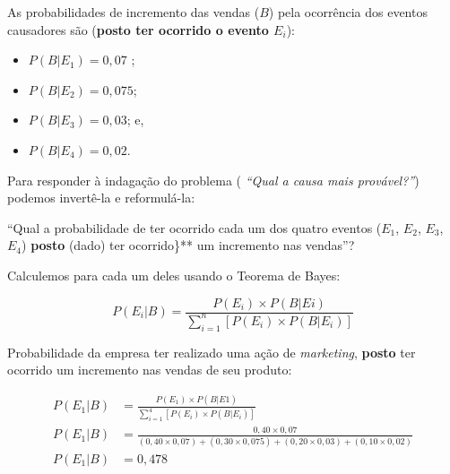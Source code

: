 \documentclass[
]{book}
\providecommand{\tightlist}{%
  \setlength{\itemsep}{0pt}\setlength{\parskip}{0pt}}
\begin{document}
\hfill\break

As probabilidades de incremento das vendas (\(B\)) pela ocorrência dos eventos causadores são (\textbf{posto ter ocorrido o evento \(E_{i}\)}):

\hfill\break

\begin{itemize}
\tightlist
\item
  \(P(B|E_{1}) = 0,07\) ;
\item
  \(P(B|E_{2}) = 0,075\);\\
\item
  \(P(B|E_{3}) = 0,03\); e,\\
\item
  \(P(B|E_{4}) = 0,02\).
\end{itemize}

\hfill\break

Para responder à indagação do problema ( \emph{``Qual a causa mais provável?''}) podemos invertê-la e reformulá-la:

\hfill\break

``Qual a probabilidade de ter ocorrido cada um dos quatro eventos (\(E_{1}\), \(E_{2}\), \(E_{3}\), \(E_{4}\)) \textbf{posto} (dado) ter ocorrido\}** um incremento nas vendas''?

\hfill\break

Calculemos para cada um deles usando o Teorema de Bayes:

\hfill\break

\[
P(E_{i}|B) = \frac{ P(E_{i}) \times P(B|E{i})   }{  \sum _{i=1}^{n}\left[P\left({E}_{i}\right)\times P\left(B|{E}_{i}\right)\right]  }
\]

\hfill\break

Probabilidade da empresa ter realizado uma ação de \emph{marketing}, \textbf{posto} ter ocorrido um incremento nas vendas de seu produto:

\hfill\break

\begin{align*}
P(E_{1}|B) &  = \frac{ P(E_{1}) \times P(B|E{1})   }{  \sum _{i=1}^{4}\left[P\left({E}_{i}\right)\times P\left(B|{E}_{i}\right)\right] } \\
P(E_{1}|B) & = \frac{0,40 \times 0,07} { (0,40 \times 0,07) + (0,30 \times 0,075) +(0,20 \times 0,03) +(0,10 \times 0,02) } \\
P(E_{1}|B) & = 0,478 \\
\end{align*}

\hfill\break
\end{document}
